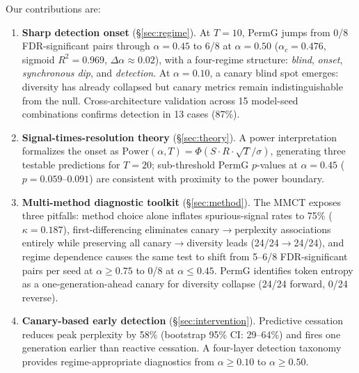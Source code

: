 Our contributions are:
\begin{enumerate}
    \item \textbf{Sharp detection onset} (\S\ref{sec:regime}).
    At $T{=}10$, PermG jumps from 0/8 FDR-significant pairs through $\alpha{=}0.45$ to 6/8 at $\alpha{=}0.50$ ($\alpha_c{=}0.476$, sigmoid $R^2{=}0.969$, $\Delta\alpha{\approx}0.02$), with a four-regime structure: \emph{blind}, \emph{onset}, \emph{synchronous dip}, and \emph{detection}.
    At $\alpha{=}0.10$, a canary blind spot emerges: diversity has already collapsed but canary metrics remain indistinguishable from the null.
    Cross-architecture validation across 15 model-seed combinations confirms detection in 13 cases (87\%).

    \item \textbf{Signal-times-resolution theory} (\S\ref{sec:theory}).
    A power interpretation formalizes the onset as $\mathrm{Power}(\alpha, T) = \Phi(S \cdot R \cdot \sqrt{T}/\sigma)$, generating three testable predictions for $T{=}20$; sub-threshold PermG $p$-values at $\alpha{=}0.45$ ($p{=}0.059$--$0.091$) are consistent with proximity to the power boundary.

    \item \textbf{Multi-method diagnostic toolkit} (\S\ref{sec:method}).
    The MMCT exposes three pitfalls: method choice alone inflates spurious-signal rates to 75\% ($\kappa{=}0.187$), first-differencing eliminates canary$\to$perplexity associations entirely while preserving all canary$\to$diversity leads (24/24$\to$24/24), and regime dependence causes the same test to shift from 5--6/8 FDR-significant pairs per seed at $\alpha{\geq}0.75$ to 0/8 at $\alpha{\leq}0.45$.
    PermG identifies token entropy as a one-generation-ahead canary for diversity collapse (24/24 forward, 0/24 reverse).

    \item \textbf{Canary-based early detection} (\S\ref{sec:intervention}).
    Predictive cessation reduces peak perplexity by 58\% (bootstrap 95\% CI: 29--64\%) and fires one generation earlier than reactive cessation.
    A four-layer detection taxonomy provides regime-appropriate diagnostics from $\alpha{\geq}0.10$ to $\alpha{\geq}0.50$.
\end{enumerate}
